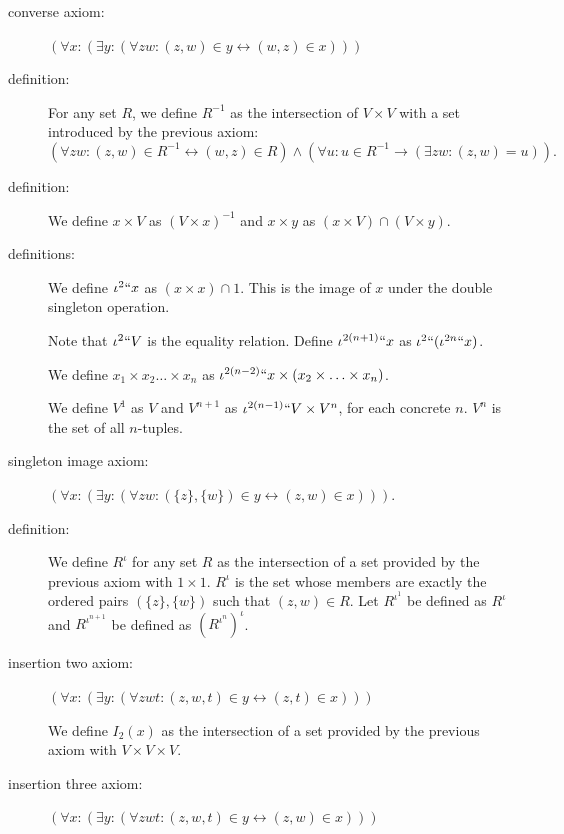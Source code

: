 \documentclass{article}
\theoremstyle{definition}
\theoremstyle{remark}
\begin{document}
{\begin{description}
\item[converse axiom:] $(\forall x:(\exists y:(\forall zw:(z,w)\in y \leftrightarrow (w,z) \in x)))$



\item[definition:]  For any set $R$, we define $R^{-1}$ as the intersection of $V \times V$ with a set introduced by the previous axiom:  $$(\forall zw:(z,w)\in R^{-1} \leftrightarrow (w,z) \in R) \wedge (\forall u:u \in R^{-1} \rightarrow (\exists zw:(z,w)=u)).$$

\item[definition:]  We define $x \times V$ as $(V \times x)^{-1}$ and $x \times y$ as $(x \times V) \cap (V \times y)$.

\item[definitions:] We define $\iota^2``x$ as $(x \times x) \cap 1$.  This is the image of $x$ under the double singleton operation.

Note that $\iota^2``V$ is the equality relation.  Define $\iota^{2(n+1)}``x$ as $\iota^2``(\iota^{2n}``x)$.

We define $x_1 \times x_2 \ldots \times x_n$ as $\iota^{2(n-2)}``x \times (x_2 \times \ldots \times x_n)$.

We define $V^1$ as $V$ and $V^{n+1}$ as $\iota^{2(n-1)}``V\times V^n$, for each concrete $n$.  $V^n$ is the set of all $n$-tuples.

\item[singleton image axiom:]  $(\forall x:(\exists y:(\forall zw:(\{z\},\{w\}) \in y \leftrightarrow (z,w) \in x)))$.
\item[definition:]  We define $R^{\iota}$ for any set $R$ as the intersection of a set provided by the previous axiom with $1 \times 1$.  $R^{\iota}$ is the set whose members are exactly the ordered pairs $(\{z\},\{w\})$ such that $(z,w)\in R$.  Let $R^{\iota^1}$ be defined as $R^{\iota}$ and $R^{\iota^{n+1}}$ be defined as $(R^{\iota^n})^\iota$.



\item[insertion two axiom:]  $(\forall x:(\exists y:(\forall zwt:(z,w,t) \in y \leftrightarrow (z,t) \in x)))$

We define $I_2(x)$ as the intersection of a set provided by the previous axiom with $V \times V \times V$.

\item[insertion three axiom:] $(\forall x:(\exists y:(\forall zwt:(z,w,t) \in y \leftrightarrow (z,w) \in x)))$


\end{description}}
\end{document}
